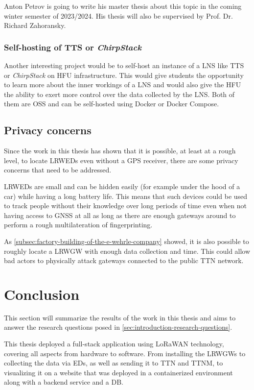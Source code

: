 Anton Petrov is going to write his master thesis about this topic in the coming winter semester of 2023/2024.
His thesis will also be supervised by Prof. Dr. Richard Zahoransky.

\subsubsection{Self-hosting of \acl{TTS} or \emph{ChirpStack}}

Another interesting project would be to self-host an instance of a \ac{LNS} like \ac{TTS} or \emph{ChirpStack} on \ac{HFU} infrastructure.
This would give students the opportunity to learn more about the inner workings of a \ac{LNS} and would also give the \ac{HFU} the ability to exert more control over the data collected by the \ac{LNS}.
Both of them are \ac{OSS} and can be self-hosted using Docker or Docker Compose.

\subsection{Privacy concerns}

Since the work in this thesis has shown that it is possible, at least at a rough level, to locate \aclp{LRWED} even without a \ac{GPS} receiver, there are some privacy concerns that need to be addressed.

\aclp{LRWED} are small and can be hidden easily (for example under the hood of a car) while having a long battery life.
This means that such devices could be used to track people without their knowledge over long periods of time even when not having access to \ac{GNSS} at all as long as there are enough gateways around to perform a rough multilateration of fingerprinting.

As \cref{subsec:factory-building-of-the-e-wehrle-company} showed, it is also possible to roughly locate a \acl{LRWGW} with enough data collection and time.
This could allow bad actors to physically attack gateways connected to the public \ac{TTN} network.

\section{Conclusion}

This section will summarize the results of the work in this thesis and aims to answer the research questions posed in \cref{sec:introduction-research-questions}.

This thesis deployed a full-stack application using \ac{LoRaWAN} technology, covering all aspects from hardware to software.
From installing the \aclp{LRWGW} to collecting the data via \aclp{ED}, as well as sending it to \ac{TTN} and \ac{TTNM}, to visualizing it on a website that was deployed in a containerized environment along with a backend service and a \ac{DB}.

